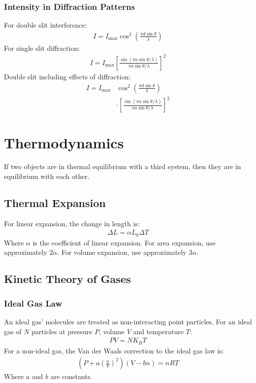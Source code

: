 \documentclass[11pt]{article}
\begin{document}
\begin{multicols*}{3}
\subsubsection{Intensity in Diffraction Patterns}
For double slit interference:
\begin{align*}
I = I_{\text{max}} \cos^2\left(\frac{\pi d \sin{\theta}}{\lambda} \right)
\end{align*}
For single slit diffraction:
\begin{align*}
I = I_{\text{max}} \left [\frac{\sin(\pi a \sin \theta / \lambda)}{\pi a \sin \theta / \lambda} \right]^2
\end{align*}
Double slit including effects of diffraction:
\begin{align*}
I = I_{\text{max}} &\cos^2\left(\frac{\pi d \sin{\theta}}{\lambda} \right) \\
&\cdot  \left [\frac{\sin(\pi a \sin \theta / \lambda)}{\pi a \sin \theta / \lambda} \right]^2
\end{align*}
	
\section{Thermodynamics}
If two objects are in thermal equilibrium with a third system, then they are in equilibrium with each other. 

\subsection{Thermal Expansion}
For linear expansion, the change in length is:
\begin{align*}
  \Delta L = \alpha L_0 \Delta T
\end{align*}
Where $\alpha$ is the coefficient of linear expansion. For area expansion, use approximately $2 \alpha $. For volume expansion, use approximately $3 \alpha$.

\subsection{Kinetic Theory of Gases}
\subsubsection{Ideal Gas Law}
An ideal gas' molecules are treated as non-interacting point particles. For an ideal gas of $N$ particles at pressure $P$, volume $V$ and temperature $T$:
\begin{align*}
  PV = NK_BT
\end{align*}
For a non-ideal gas, the Van der Waals correction to the ideal gas law is:
\begin{align*}
  \left( P + a \left(\frac{n}{V}\right) ^2 \right) \left( V - bn\right) = nRT
\end{align*}
Where $a$ and $b$ are constants.


\end{multicols*}
\end{document}
